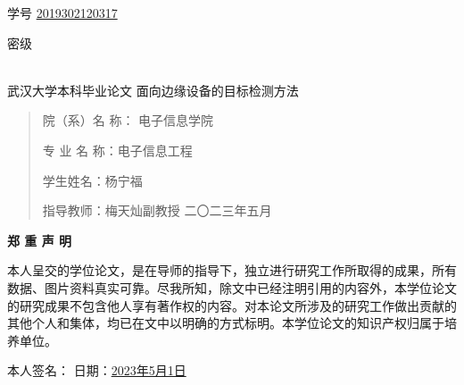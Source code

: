 \documentclass{ctexart}
\date{}
\numberwithin{equation}{section}%
\numberwithin{figure}{section}%
\numberwithin{table}{section}%
\begin{document}
	
	
	\heiti {}\qquad\qquad\qquad\qquad\qquad\qquad\qquad\qquad\qquad\qquad\qquad\qquad\qquad\qquad\qquad 学号 \underline {2019302120317}
	
	\heiti {}\qquad\qquad\qquad\qquad\qquad\qquad\qquad\qquad\qquad\qquad\qquad\qquad\qquad\qquad\qquad 密级 \underline {\qquad\qquad\qquad\quad}
	
	\begin{center}
		\quad \\
		\vskip 1cm
		\songti {} 武汉大学本科毕业论文
		\vskip 3.5cm
		\heiti {} 面向边缘设备的目标检测方法	
	\end{center}
	\vskip 2cm	
	\begin{quotation}
		\doublespacing
		

		\songti {}\setlength\parindent{7em}
		
		\quad
		
		院（系）名 称： 电子信息学院
		
		专 业 名 称：电子信息工程
		
		学生姓名：杨宁福
		
		指导教师：梅天灿\quad 副教授
		\vskip 3cm
		\centering
		\songti {}二〇二三年五月
	\end{quotation}

	\newpage
	\thispagestyle{empty}
	\begin{center}
		\songti{} \textbf{郑 \quad 重 \quad 声 \quad 明}
	\end{center}
	\vskip 2cm
	\songti\zihao{4}
	\qquad 本人呈交的学位论文，是在导师的指导下，独立进行研究工作所取得的成果，所有数据、图片资料真实可靠。尽我所知，除文中已经注明引用的内容外，本学位论文的研究成果不包含他人享有著作权的内容。对本论文所涉及的研究工作做出贡献的其他个人和集体，均已在文中以明确的方式标明。本学位论文的知识产权归属于培养单位。
	
	\vskip 5cm
	\begin{center}
		本人签名：	
		\raisebox{-0.25\baselineskip}{\texttt{[image: n]}} \qquad\qquad\qquad 日期：\underline{\quad  2023年5月1日 \quad}
	\end{center}
	
\end{document}
